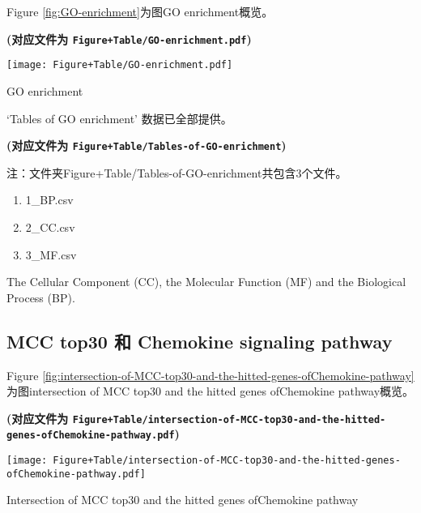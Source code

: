 \documentclass[
]{article}
\providecommand{\tightlist}{%
  \setlength{\itemsep}{0pt}\setlength{\parskip}{0pt}}
\begin{document}
Figure \ref{fig:GO-enrichment}为图GO enrichment概览。

\textbf{(对应文件为 \texttt{Figure+Table/GO-enrichment.pdf})}

\def\@captype{figure}
\begin{center}
\texttt{[image: Figure+Table/GO-enrichment.pdf]}
\caption{GO enrichment}\label{fig:GO-enrichment}
\end{center}

`Tables of GO enrichment' 数据已全部提供。

\textbf{(对应文件为 \texttt{Figure+Table/Tables-of-GO-enrichment})}

\begin{center}\begin{tcolorbox}[colback=gray!10, colframe=gray!50, width=0.9\linewidth, arc=1mm, boxrule=0.5pt]注：文件夹Figure+Table/Tables-of-GO-enrichment共包含3个文件。

\begin{enumerate}\tightlist
\item 1\_BP.csv
\item 2\_CC.csv
\item 3\_MF.csv
\end{enumerate}\end{tcolorbox}
\end{center}

The Cellular Component (CC), the Molecular Function (MF) and the Biological Process (BP).

\hypertarget{mcc-top30-ux548c-chemokine-signaling-pathway}{%
\subsection{MCC top30 和 Chemokine signaling pathway}\label{mcc-top30-ux548c-chemokine-signaling-pathway}}

Figure \ref{fig:intersection-of-MCC-top30-and-the-hitted-genes-ofChemokine-pathway}为图intersection of MCC top30 and the hitted genes ofChemokine pathway概览。

\textbf{(对应文件为 \texttt{Figure+Table/intersection-of-MCC-top30-and-the-hitted-genes-ofChemokine-pathway.pdf})}

\def\@captype{figure}
\begin{center}
\texttt{[image: Figure+Table/intersection-of-MCC-top30-and-the-hitted-genes-ofChemokine-pathway.pdf]}
\caption{Intersection of MCC top30 and the hitted genes ofChemokine pathway}\label{fig:intersection-of-MCC-top30-and-the-hitted-genes-ofChemokine-pathway}
\end{center}
\end{document}
